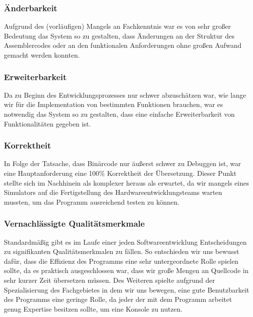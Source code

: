 \documentclass[paper=a4,fontsize=12pt]{scrreprt}
\begin{document}
\subsubsection{Änderbarkeit}
Aufgrund des (vorläufigen) Mangels an Fachkenntnis war es von sehr großer Bedeutung das System so zu gestalten, dass Änderungen an der Struktur des Assemblercodes oder an den funktionalen Anforderungen ohne großen Aufwand gemacht werden konnten.

\subsubsection{Erweiterbarkeit}
Da zu Beginn des Entwicklungsprozesses nur schwer abzuschätzen war, wie lange wir für die Implementation von bestimmten Funktionen brauchen, war es notwendig das System so zu gestalten, dass eine einfache Erweiterbarkeit von Funktionalitäten gegeben ist.

\subsubsection{Korrektheit}
In Folge der Tatsache, dass Binärcode nur äußerst schwer zu Debuggen ist, war eine Hauptanforderung eine 100\% Korrektheit der Übersetzung. Dieser Punkt stellte sich im Nachhinein als komplexer heraus als erwartet, da wir mangels eines Simulators auf die Fertigstellung des Hardwareentwicklungsteams warten mussten, um das Programm ausreichend testen zu können.

\subsubsection{Vernachlässigte Qualitätsmerkmale}
Standardmäßig gibt es im Laufe einer jeden Softwareentwicklung Entscheidungen zu signifikanten Qualitätsmerkmalen zu fällen. So entschieden wir uns bewusst dafür, dass die Effizienz des Programms eine sehr untergeordnete Rolle spielen sollte, da es praktisch ausgeschlossen war, dass wir große Mengen an Quellcode in sehr kurzer Zeit übersetzen müssen. Des Weiteren spielte aufgrund der Spezialisierung des Fachgebietes in dem wir uns bewegen, eine gute Benutzbarkeit des Programms eine geringe Rolle, da jeder der mit dem Programm arbeitet genug Expertise besitzen sollte, um eine Konsole zu nutzen.
\end{document}
